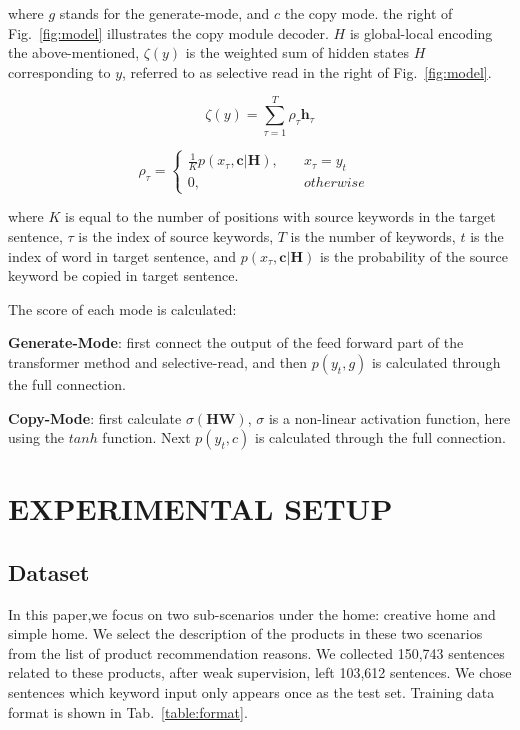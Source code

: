 \documentclass[sigconf]{acmart}
\begin{document}
where $g$ stands for the generate-mode, and $c$ the
copy mode. the right of Fig.~\ref{fig:model} illustrates the copy module decoder. $H$ is global-local encoding the above-mentioned, $\zeta(y)$ is the weighted sum of hidden states $H$ corresponding to $y$, referred to as selective read in the right of Fig.~\ref{fig:model}. 

\begin{equation}\label{equ:zeta}
    \zeta(y) = \sum^{T}_{\tau = 1} \rho_\tau \textbf{h}_\tau 
\end{equation}

\begin{equation}\label{equ:rho}
    \rho_\tau = \left\{
        \begin{aligned}
        \frac{1}{K} p(x_\tau,\textbf{c}|\textbf{H}), \quad & x_\tau = y_t & \\
        0, \quad & otherwise &
        \end{aligned} 
        \right.
\end{equation}

where $K$ is equal to the number of positions with source keywords in the target sentence, $\tau$ is the index of source keywords, $T$ is the number of keywords, $t$ is the index of word in target sentence, and $p(x_\tau,\textbf{c}|\textbf{H})$ is the probability of the source keyword be copied in target sentence. 

The score of each mode is calculated:

\textbf{Generate-Mode}: first connect the output of the feed forward part of the transformer method and selective-read, and then $p(y_t,g)$ is calculated through the full connection. 

\textbf{Copy-Mode}: first calculate $\sigma(\textbf{H}\textbf{W})$, $\sigma$ is a non-linear activation function, here using the $tanh$ function. Next $p(y_t,c)$ is calculated through the full connection. 

\section{EXPERIMENTAL SETUP}\label{sec:experiment}
\subsection{Dataset}
In this paper,we focus on two sub-scenarios under the home: creative home and simple home. We select the description of the products in these two scenarios from the list of product recommendation reasons. We collected 150,743 sentences related to these products, after weak supervision, left 103,612 sentences. We chose sentences which keyword input only appears once as the test set. Training data format is shown in Tab.~\ref{table:format}. 
\end{document}
